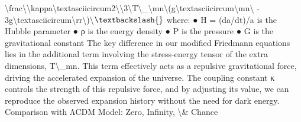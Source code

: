 \documentclass[12pt]{article}
\begin{document}
\textbackslash{}frac\textbackslash{}{\textbackslash{}kappa\textbackslash{}textasciicircum{}2\textbackslash{}}\textbackslash{}{3\textbackslash{}}T\textbackslash{}_\textbackslash{}{mn\textbackslash{}}(g\textbackslash{}textasciicircum{}\textbackslash{}{mn\textbackslash{}} - 3g\textbackslash{}textasciicircum{}\textbackslash{}{rr\textbackslash{}})\textbackslash{}$\textbackslash{}$
where:
●
H = (da/dt)/a is the Hubble parameter
●
ρ is the energy density
●
P is the pressure
●
G is the gravitational constant
The key diﬀerence in our modiﬁed Friedmann equations lies in the additional term
involving the stress-energy tensor of the extra dimensions, T\textbackslash{}_mn. This term eﬀectively
acts as a repulsive gravitational force, driving the accelerated expansion of the
universe. The coupling constant κ controls the strength of this repulsive force, and by
adjusting its value, we can reproduce the observed expansion history without the need
for dark energy.
Comparison with ΛCDM Model:
Zero, Infinity, \textbackslash{}& Chance
\end{document}
